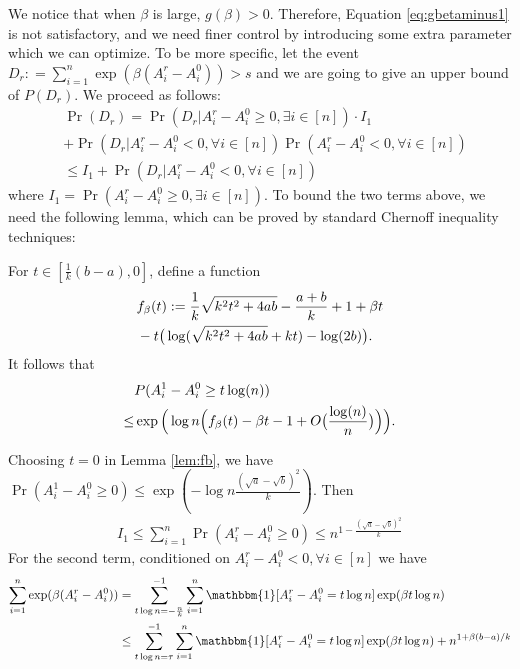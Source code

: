 \documentclass{article}
\begin{document}
We notice that when $\beta$ is large, $g(\beta) > 0$. Therefore, Equation \eqref{eq:gbetaminus1} is not satisfactory, and
we need finer control by introducing some extra parameter which we can optimize. To be more specific, let
the event $D_r : = \sum_{i=1}^n\exp ( \beta(A^r_i-A^0_i)) > s$
and we are going to give an upper bound of $P(D_r)$. We proceed as follows: 
\begin{align*}
&\Pr(D_r) = 
\Pr(D_r| A_i^r - A_i^0 \geq 0, \exists i\in [n])
\cdot I_1 \\
&+ \Pr(D_r | A_i^r - A_i^0  < 0, \forall i\in [n])
\Pr(  A_i^r - A_i^0  < 0 , \forall i \in [n] ) \\
& \leq I_1
+ \Pr(D_r | A_i^r - A_i^0  < 0, \forall i\in [n])
\end{align*}
where $I_1 = \Pr( A_i^r - A_i^0 \geq 0, \exists i\in [n])$.
To bound the two terms above, we need the following lemma, which can be proved by standard Chernoff inequality techniques:
\begin{lemma}\label{lem:fb}
	For $t\in [\frac{1}{k}(b-a), 0]$,
	define a function
	\begin{align}
	&f_{\beta}(t):=\frac{1}{k}\sqrt{k^2t^2+4ab} -\frac{a+b}{k} +1 +\beta t  \notag\\
	&-t\big(\log(\sqrt{k^2t^2+4ab}+kt)-\log(2b) \big). \label{eq:fbetat}
	\end{align}
	It follows that
	\begin{align} 
	& P(A^1_i-A^0_i\ge t\log(n))  \notag\\
	\le &  \exp\Big(\log n \Big(f_{\beta}(t) -\beta t  - 1 + O\big(\frac{\log(n)}{n}\big) \Big)\Big) .
	\end{align}
\end{lemma}
Choosing $t=0$ in Lemma \ref{lem:fb}, we have
$\Pr(A^1_i-A^0_i\ge 0 ) \leq \exp(-\log n \frac{(\sqrt{a}-\sqrt{b})^2}{k})$.
Then
\begin{align}\label{eq:I_1}
I_1 \leq \sum_{i=1}^n \Pr( A_i^r - A_i^0 \geq 0) \leq n^{1-\frac{(\sqrt{a}-\sqrt{b})^2}{k}}
\end{align}
For the second term,
conditioned on $A_i^r - A_i^0  < 0, \forall i\in [n]$ we have
\begin{align}
\sum_{i=1}^n\exp ( \beta(A^r_i-A^0_i))
& = \sum_{t\log n =-\frac{n}{k}}^{-1}\sum_{i=1}^n \mathbbm{1}[A^r_i - A^0_i = t \log n] \exp ( \beta  t\log n) \label{eq:split_tlogn} \\ 
& \leq
\sum_{t\log n =\tau}^{-1}\sum_{i=1}^n \mathbbm{1}[A^r_i - A^0_i = t \log n]\exp ( \beta  t\log n) + n^{1+\beta(b-a)/k}
\end{align}
\end{document}
